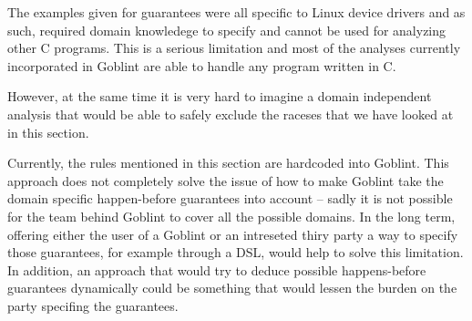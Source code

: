 \documentclass[..thesis.tex]{subfiles}
\begin{document}

The examples given for guarantees were all specific to Linux device drivers and as such, required domain knowledege to specify and cannot be used for analyzing other C programs. This is a serious limitation and most of the analyses currently incorporated in Goblint are able to handle any program written in C. 


However, at the same time it is very hard to imagine a domain independent analysis that would be able to safely exclude the raceses that we have looked at in this section.

Currently, the rules mentioned in this section are hardcoded into Goblint. This approach does not completely solve the issue of how to make Goblint take the domain specific happen-before guarantees into account -- sadly it is not possible for the team behind Goblint to cover all the possible domains. In the long term, offering either the user of a Goblint or an intreseted thiry party a way to specify those guarantees, for example through a DSL,  would help to solve this limitation. In addition, an approach that would try to deduce possible happens-before guarantees dynamically could be something that would lessen the burden on the party specifing the guarantees. 
\end{document}
